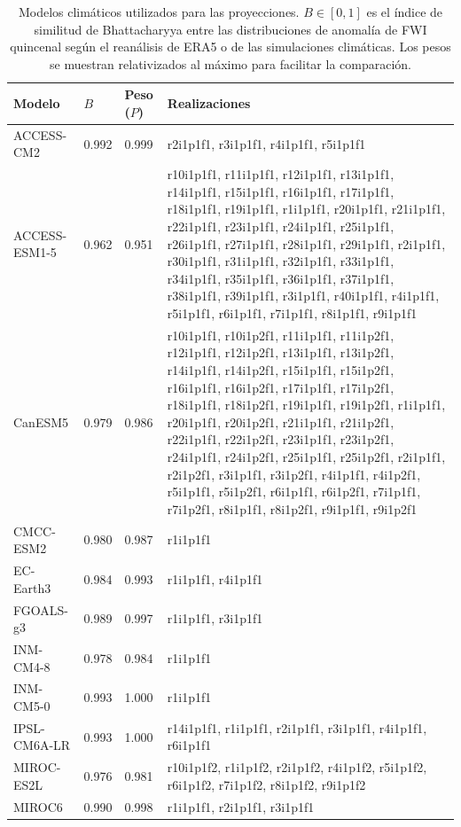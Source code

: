 \begin{table}[htbp]
\centering
\caption[Modelos climáticos utilizados para las proyecciones.]{Modelos climáticos utilizados para las proyecciones. $B \in [0, 1]$ es el índice de similitud de Bhattacharyya entre las distribuciones de anomalía de FWI quincenal según el reanálisis de ERA5 o de las simulaciones climáticas. Los pesos se muestran relativizados al máximo para facilitar la comparación.}
\label{tab:climtable}
\small
\begin{tabular}{L{3cm} C{1.5cm} C{1.5cm} L{8cm}}
\toprule
Modelo & $B$ & Peso ($P$) & Realizaciones \\
\midrule
ACCESS-CM2 & 0.992 & 0.999 & r2i1p1f1, r3i1p1f1, r4i1p1f1, r5i1p1f1\\
ACCESS-ESM1-5 & 0.962 & 0.951 & r10i1p1f1, r11i1p1f1, r12i1p1f1, r13i1p1f1, r14i1p1f1, r15i1p1f1, r16i1p1f1, r17i1p1f1, r18i1p1f1, r19i1p1f1, r1i1p1f1, r20i1p1f1, r21i1p1f1, r22i1p1f1, r23i1p1f1, r24i1p1f1, r25i1p1f1, r26i1p1f1, r27i1p1f1, r28i1p1f1, r29i1p1f1, r2i1p1f1, r30i1p1f1, r31i1p1f1, r32i1p1f1, r33i1p1f1, r34i1p1f1, r35i1p1f1, r36i1p1f1, r37i1p1f1, r38i1p1f1, r39i1p1f1, r3i1p1f1, r40i1p1f1, r4i1p1f1, r5i1p1f1, r6i1p1f1, r7i1p1f1, r8i1p1f1, r9i1p1f1\\
CanESM5 & 0.979 & 0.986 & r10i1p1f1, r10i1p2f1, r11i1p1f1, r11i1p2f1, r12i1p1f1, r12i1p2f1, r13i1p1f1, r13i1p2f1, r14i1p1f1, r14i1p2f1, r15i1p1f1, r15i1p2f1, r16i1p1f1, r16i1p2f1, r17i1p1f1, r17i1p2f1, r18i1p1f1, r18i1p2f1, r19i1p1f1, r19i1p2f1, r1i1p1f1, r20i1p1f1, r20i1p2f1, r21i1p1f1, r21i1p2f1, r22i1p1f1, r22i1p2f1, r23i1p1f1, r23i1p2f1, r24i1p1f1, r24i1p2f1, r25i1p1f1, r25i1p2f1, r2i1p1f1, r2i1p2f1, r3i1p1f1, r3i1p2f1, r4i1p1f1, r4i1p2f1, r5i1p1f1, r5i1p2f1, r6i1p1f1, r6i1p2f1, r7i1p1f1, r7i1p2f1, r8i1p1f1, r8i1p2f1, r9i1p1f1, r9i1p2f1\\
CMCC-ESM2 & 0.980 & 0.987 & r1i1p1f1\\
EC-Earth3 & 0.984 & 0.993 & r1i1p1f1, r4i1p1f1\\
FGOALS-g3 & 0.989 & 0.997 & r1i1p1f1, r3i1p1f1\\
INM-CM4-8 & 0.978 & 0.984 & r1i1p1f1\\
INM-CM5-0 & 0.993 & 1.000 & r1i1p1f1\\
IPSL-CM6A-LR & 0.993 & 1.000 & r14i1p1f1, r1i1p1f1, r2i1p1f1, r3i1p1f1, r4i1p1f1, r6i1p1f1\\
MIROC-ES2L & 0.976 & 0.981 & r10i1p1f2, r1i1p1f2, r2i1p1f2, r4i1p1f2, r5i1p1f2, r6i1p1f2, r7i1p1f2, r8i1p1f2, r9i1p1f2\\
MIROC6 & 0.990 & 0.998 & r1i1p1f1, r2i1p1f1, r3i1p1f1\\

\end{tabular}
\end{table}
